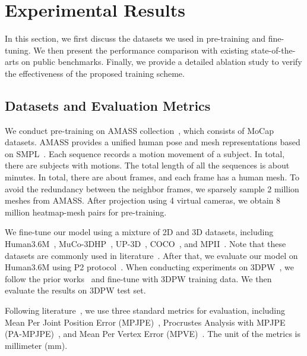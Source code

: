 \section{Experimental Results}\label{sec:exp}

In this section, we first discuss the datasets we used in pre-training and fine-tuning. We then present the performance comparison with existing state-of-the-arts on public benchmarks. Finally, we provide a detailed ablation study to verify the effectiveness of the proposed training scheme.



\subsection{Datasets and Evaluation Metrics}

We conduct pre-training on AMASS collection~\cite{mahmood2019amass}, which consists of  MoCap datasets. AMASS provides a unified human pose and mesh representations based on SMPL~\cite{loper2015smpl}. Each sequence records a motion movement of a subject. In total, there are  subjects with  motions. The total length of all the sequences is about  minutes. In total, there are about  frames, and each frame has a human mesh. To avoid the redundancy between the neighbor frames, we sparsely sample 2 million meshes from AMASS. After projection using 4 virtual cameras, we obtain 8 million heatmap-mesh pairs for pre-training. 


We fine-tune our model using a mixture of 2D and 3D datasets, including Human3.6M~\cite{ionescu2014human3}, MuCo-3DHP~\cite{mehta2018single}, UP-3D~\cite{lassner2017unite},  COCO~\cite{lin2014microsoft}, and MPII~\cite{andriluka14cvpr}. Note that these datasets are commonly used in literature~\cite{Choi_2020_ECCV_Pose2Mesh,lin2020end,lin2021mesh,cho2022FastMETRO}. After that, we evaluate our model on Human3.6M using P2 protocol~\cite{kanazawa2018end,kolotouros2019learning}. When conducting experiments on 3DPW~\cite{vonMarcard2018}, we follow the prior works~\cite{kocabas2019vibe,lin2020end,lin2021mesh,cho2022FastMETRO} and fine-tune with 3DPW training data. We then evaluate the results on 3DPW test set. 


Following literature~\cite{kanazawa2018end, kolotouros2019convolutional,kolotouros2019learning,cho2022FastMETRO,li2022cliff}, we use three standard metrics for evaluation, including Mean Per Joint Position Error (MPJPE)~\cite{ionescu2014human3}, Procrustes Analysis with MPJPE (PA-MPJPE)~\cite{zhou2018monocap}, and Mean Per Vertex Error (MPVE)~\cite{pavlakos2018learning}. The unit of the metrics is millimeter (mm).



